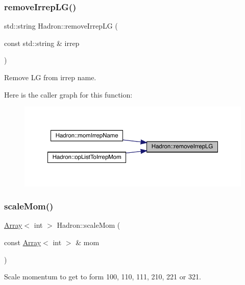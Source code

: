 \subsubsection{\texorpdfstring{removeIrrepLG()}{removeIrrepLG()}}
{\footnotesize\ttfamily std\+::string Hadron\+::remove\+Irrep\+LG (\begin{DoxyParamCaption}\item[{const std\+::string \&}]{irrep }\end{DoxyParamCaption})}



Remove LG from irrep name. 

Here is the caller graph for this function\+:\nopagebreak
\begin{figure}[H]
\begin{center}
\leavevmode
\includegraphics[width=350pt]{d1/daf/namespaceHadron_aff55b5fd81ffee95432b7d4e1c8d01e6_icgraph}
\end{center}
\end{figure}
\mbox{\label{namespaceHadron_ab3424b316e2a4d8e820c88f8027742e1}} 
\subsubsection{\texorpdfstring{scaleMom()}{scaleMom()}}
{\footnotesize\ttfamily \mbox{\hyperlink{classXMLArray_1_1Array}{Array}}$<$ int $>$ Hadron\+::scale\+Mom (\begin{DoxyParamCaption}\item[{const \mbox{\hyperlink{classXMLArray_1_1Array}{Array}}$<$ int $>$ \&}]{mom }\end{DoxyParamCaption})}



Scale momentum to get to form 100, 110, 111, 210, 221 or 321. 

